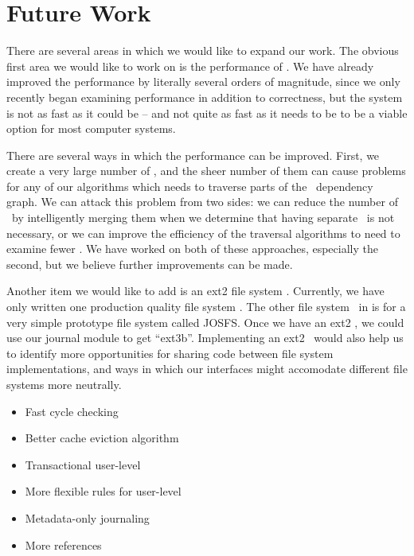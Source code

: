 \section {Future Work}
\label{sec:future}

There are several areas in which we would like to expand our work. The obvious
first area we would like to work on is the performance of \Kudos. We have
already improved the performance by literally several orders of magnitude, since
we only recently began examining performance in addition to correctness, but the
system is not as fast as it could be -- and not quite as fast as it needs to be
to be a viable option for most computer systems.

There are several ways in which the performance can be improved. First, we
create a very large number of \chdescs, and the sheer number of them can cause
problems for any of our algorithms which needs to traverse parts of the \chdesc\
dependency graph. We can attack this problem from two sides: we can reduce the
number of \chdescs\ by intelligently merging them when we determine that having
separate \chdescs\ is not necessary, or we can improve the efficiency of the
traversal algorithms to need to examine fewer \chdescs. We have worked on both
of these approaches, especially the second, but we believe further improvements
can be made.

Another item we would like to add is an ext2 file system \module. Currently,
we have only written one production quality file system \module. The other
file system \module\ in \Kudos is for a very simple prototype file system
called JOSFS. Once we have an ext2 \module, we could use our journal module to
get ``ext3b''. Implementing an ext2 \module\ would also help us to identify
more opportunities for sharing code between file system implementations, and
ways in which our interfaces might accomodate different file systems more
neutrally.

\begin{itemize}
\item Fast cycle checking
\item Better cache eviction algorithm
\item Transactional user-level \chdescs
\item More flexible rules for user-level \chdescs
\item Metadata-only journaling
\item More references
\end{itemize}
